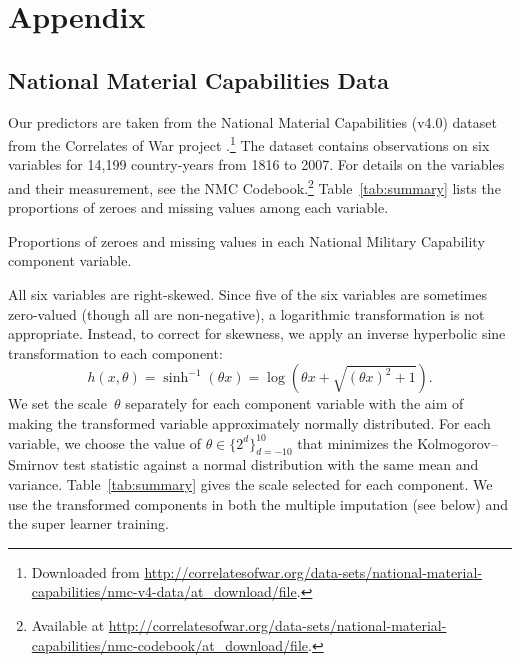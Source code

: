 
\section{Appendix}

\subsection{National Material Capabilities Data}

Our predictors are taken from the National Material Capabilities (v4.0) dataset from the Correlates of War project .\footnote{
  Downloaded from \url{http://correlatesofwar.org/data-sets/national-material-capabilities/nmc-v4-data/at_download/file}.
}
The dataset contains observations on six variables for 14,199 country-years from 1816 to 2007.
For details on the variables and their measurement, see the NMC Codebook.\footnote{
  Available at \url{http://correlatesofwar.org/data-sets/national-material-capabilities/nmc-codebook/at_download/file}.
}
Table~\ref{tab:summary} lists the proportions of zeroes and missing values among each variable.

\begin{table}[htp]
  \centering
  
  \caption{
    Proportions of zeroes and missing values in each National Military Capability component variable.
  }
  \label{tab:summary}
\end{table}

All six variables are right-skewed.
Since five of the six variables are sometimes zero-valued (though all are non-negative), a logarithmic transformation is not appropriate.
Instead, to correct for skewness, we apply an inverse hyperbolic sine transformation  to each component:
\begin{equation}
  \label{eq:asinh}
  h(x, \theta)
  =
  \sinh^{-1} (\theta x)
  =
  \log \left(
    \theta x + \sqrt{(\theta x)^2 + 1}
  \right).
\end{equation}
We set the scale~$\theta$ separately for each component variable with the aim of making the transformed variable approximately normally distributed.
For each variable, we choose the value of $\theta \in \{2^d\}_{d=-10}^{10}$ that minimizes the Kolmogorov--Smirnov test statistic  against a normal distribution with the same mean and variance.
Table~\ref{tab:summary} gives the scale selected for each component.
We use the transformed components in both the multiple imputation (see below) and the super learner training.

